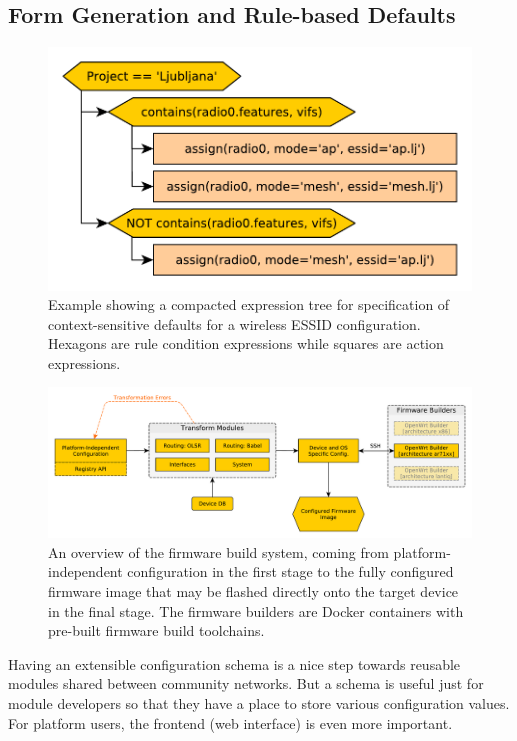 \documentclass[5p,sort&compress]{elsarticle}
\begin{document}
\subsection{Form Generation and Rule-based Defaults}

\begin{figure}[t]
  \centering
  \includegraphics[scale=0.5]{figures/defaults-rules-tree.pdf}
  \caption{Example showing a compacted expression tree for specification of context-sensitive defaults for a wireless ESSID configuration. Hexagons are rule condition expressions while squares are action expressions.}
  \label{fig:defaults-rules-example}
\end{figure}

\begin{figure}
  \centering
  \includegraphics[scale=0.5]{figures/firmware-buildsystem.pdf}
  \caption{An overview of the firmware build system, coming from platform-independent configuration in the first stage to the fully configured firmware image that may be flashed directly onto the target device in the final stage.
The firmware builders are Docker containers with pre-built firmware build toolchains.}
  \label{fig:firmware-build-system}
\end{figure}

Having an extensible configuration schema is a nice step towards reusable modules shared between community networks.
But a schema is useful just for module developers so that they have a place to store various configuration values.
For platform users, the frontend (web interface) is even more important.
\end{document}
